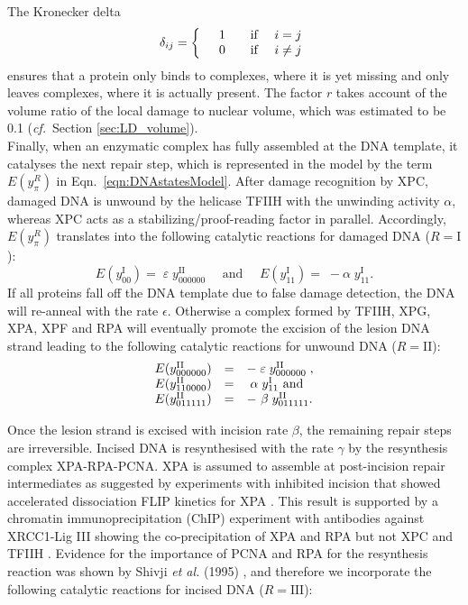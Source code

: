 The Kronecker delta 
 \begin{align*}
\delta_{ij}=\left\{
\begin{array}{l l l l}
&1 \quad   &\text{if} & i=j\\
&0 \quad& \text{if } & i \neq j\\
\end{array}
\right.
\end{align*}
ensures that a protein only binds to complexes, where it is yet missing and only leaves complexes, where it is actually present. The factor $r$ takes account of the volume ratio of the local damage to nuclear volume, which was estimated to be 0.1 (\textit{cf.}\ Section \ref{sec:LD_volume}).\\
Finally, when an enzymatic complex has fully assembled at the DNA template, it catalyses the next repair step, which is represented in the model by the term $E(y_{\pi}^{R})$ in Eqn.\ \ref{eqn:DNAstatesModel}. After damage recognition by XPC, damaged DNA is unwound by the helicase TFIIH with the unwinding activity $\alpha$, whereas XPC acts as a stabilizing/proof-reading factor in parallel. Accordingly, $E(y_{\pi}^{R})$ translates into the following catalytic reactions for damaged DNA ($R= \text{I}$):
$$E(y_{00}^\text{I})=\;\varepsilon\;y_{000000}^\text{II} \quad \text{ and }\quad
E(y_{11}^\text{I})=\;-\alpha \;y_{11}^\text{I}.$$
If all proteins fall off the DNA template due to false damage detection, the DNA will re-anneal with the rate $\epsilon$. Otherwise a complex formed by TFIIH, XPG, XPA, XPF and RPA will eventually promote the excision of the lesion DNA strand leading to the following catalytic reactions for unwound DNA ($R= \text{II}$): 	
\begin{align*}
	\begin{array}{l l l}
		E(y_{000000}^\text{II})&=&-\;	\varepsilon	\;y_{000000}^\text{II}\;, \\ E(y_{110000}^\text{II})&=&\;	\alpha	\;y_{11}^\text{I} 	\text{ and }\\
	    E(y_{011111}^\text{II})&=&-\	\beta	\;y_{011111}^\text{II}.
	\end{array}
\end{align*}

Once the lesion strand is excised with incision rate $\beta$, the remaining repair steps are irreversible. Incised DNA is resynthesised with the rate $\gamma$ by the resynthesis complex  XPA-RPA-PCNA. XPA is assumed to assemble at post-incision repair intermediates as suggested by experiments with inhibited incision that showed accelerated dissociation FLIP kinetics for XPA  \cite{Luijsterburg2010}. This result is supported by a chromatin immunoprecipitation (ChIP) \label{par:schip} experiment with antibodies against XRCC1-Lig III showing the co-precipitation of XPA and RPA but not XPC and TFIIH \cite{Moser:2007:Mol-Cell:17643379}. Evidence for the importance of PCNA and RPA for the resynthesis reaction was shown by Shivji \textit{et al.} (1995) \cite{Shivji:1995:Biochemistry:7711023}, and therefore we incorporate the following catalytic reactions for incised DNA ($R= \text{III}$):  
            
